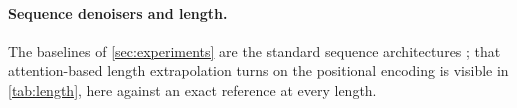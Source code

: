 \paragraph{Sequence denoisers and length.}
The baselines of \cref{sec:experiments} are the standard sequence architectures
\citep{bai2018tcn,vaswani2017attention,ronneberger2015unet}; that attention-based length
extrapolation turns on the positional encoding \citep{press2022alibi,kazemnejad2023positional}
is visible in \cref{tab:length}, here against an exact reference at every length.
